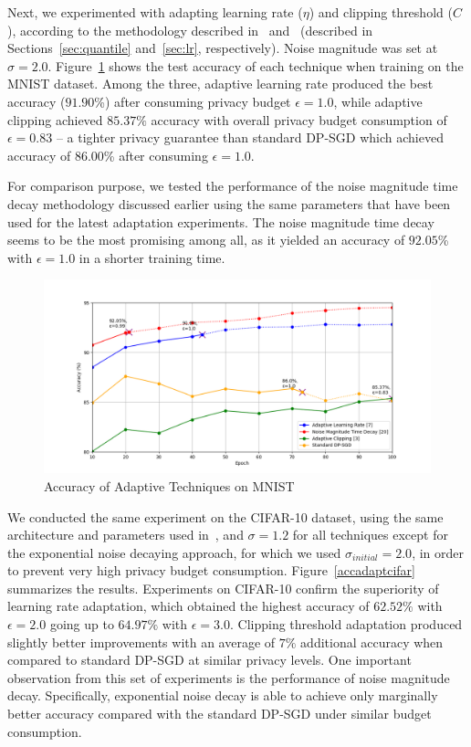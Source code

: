 Next, we experimented with adapting learning rate ($\eta$) and clipping threshold ($C$), according to the methodology described in~\cite{RefWorks:RefID:38-koskelalearning} and~\cite{RefWorks:RefID:37-andrewdifferentially} (described in Sections~\ref{sec:quantile} and~\ref{sec:lr}, respectively). Noise magnitude was set at $\sigma=2.0$. 
Figure~\ref{accadapt} shows the test accuracy of each technique when training on the MNIST dataset. 
Among the three, adaptive learning rate produced the best accuracy ($91.90$\%) after consuming privacy budget $\epsilon=1.0$, while adaptive clipping achieved $85.37\%$ accuracy with overall privacy budget consumption of $\epsilon=0.83$ -- a tighter privacy guarantee than standard DP-SGD which achieved accuracy of $86.00$\% after consuming $\epsilon=1.0$. 

For comparison purpose, we tested the performance of the noise magnitude time decay methodology discussed earlier using the same parameters that have been used for the latest adaptation experiments. The noise magnitude time decay seems to be the most promising among all, as it yielded an accuracy of $92.05$\% with $\epsilon = 1.0$ in a shorter training time. 
\begin{figure}[h]
\centering
        \includegraphics[width=\linewidth]{submissions/submission5/figs/AccAdapt.png}
   \caption{Accuracy of Adaptive Techniques on MNIST}
   \label{accadapt}
\end{figure} 

We conducted the same experiment on the CIFAR-10 dataset, using the same architecture and parameters used in~\cite{RefWorks:RefID:38-koskelalearning}, and $\sigma = 1.2$ for all techniques except for the exponential noise decaying approach, for which we used $\sigma_{initial} = 2.0$, in order to prevent very high privacy budget consumption. 
Figure~\ref{accadaptcifar} summarizes the results. 
Experiments on CIFAR-10 confirm the superiority of learning rate adaptation, which obtained the highest accuracy of $62.52\%$ with $\epsilon = 2.0$ going up to $64.97\%$ with $\epsilon = 3.0$. Clipping threshold adaptation produced slightly better improvements with an average of $7\%$ additional accuracy when compared to standard DP-SGD at similar privacy levels.
One important observation from this set of experiments is the performance of noise magnitude decay. Specifically, exponential noise decay is able to achieve only marginally better accuracy compared with the standard DP-SGD under similar budget consumption.

